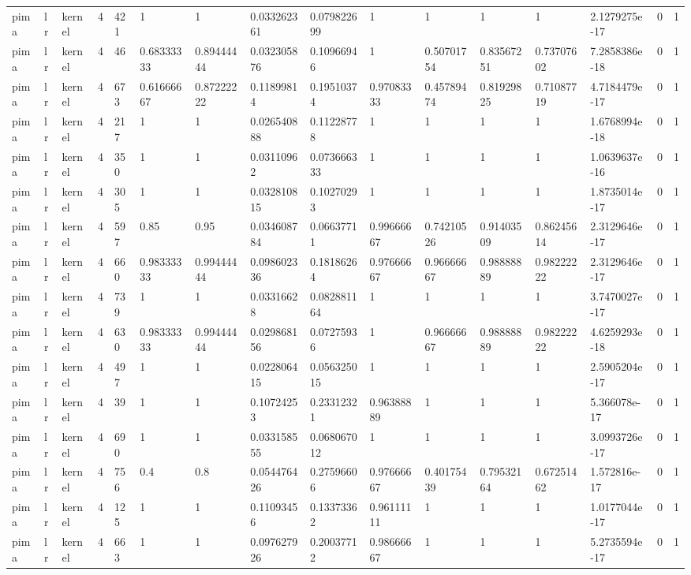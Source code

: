 \begin{tabular}{llllllllllllllll}
pima & lr & kernel & 4 & 421 & 1 & 1 & 0.033262361 & 0.079822699 & 1 & 1 & 1 & 1 & 2.1279275e-17 & 0 & 1 \\
pima & lr & kernel & 4 & 46 & 0.68333333 & 0.89444444 & 0.032305876 & 0.10966946 & 1 & 0.50701754 & 0.83567251 & 0.73707602 & 7.2858386e-18 & 0 & 1 \\
pima & lr & kernel & 4 & 673 & 0.61666667 & 0.87222222 & 0.11899814 & 0.19510374 & 0.97083333 & 0.45789474 & 0.81929825 & 0.71087719 & 4.7184479e-17 & 0 & 1 \\
pima & lr & kernel & 4 & 217 & 1 & 1 & 0.026540888 & 0.11228778 & 1 & 1 & 1 & 1 & 1.6768994e-18 & 0 & 1 \\
pima & lr & kernel & 4 & 350 & 1 & 1 & 0.03110962 & 0.073666333 & 1 & 1 & 1 & 1 & 1.0639637e-16 & 0 & 1 \\
pima & lr & kernel & 4 & 305 & 1 & 1 & 0.032810815 & 0.10270293 & 1 & 1 & 1 & 1 & 1.8735014e-17 & 0 & 1 \\
pima & lr & kernel & 4 & 597 & 0.85 & 0.95 & 0.034608784 & 0.06637711 & 0.99666667 & 0.74210526 & 0.91403509 & 0.86245614 & 2.3129646e-17 & 0 & 1 \\
pima & lr & kernel & 4 & 660 & 0.98333333 & 0.99444444 & 0.098602336 & 0.18186264 & 0.97666667 & 0.96666667 & 0.98888889 & 0.98222222 & 2.3129646e-17 & 0 & 1 \\
pima & lr & kernel & 4 & 739 & 1 & 1 & 0.03316628 & 0.082881164 & 1 & 1 & 1 & 1 & 3.7470027e-17 & 0 & 1 \\
pima & lr & kernel & 4 & 630 & 0.98333333 & 0.99444444 & 0.029868156 & 0.07275936 & 1 & 0.96666667 & 0.98888889 & 0.98222222 & 4.6259293e-18 & 0 & 1 \\
pima & lr & kernel & 4 & 497 & 1 & 1 & 0.022806415 & 0.056325015 & 1 & 1 & 1 & 1 & 2.5905204e-17 & 0 & 1 \\
pima & lr & kernel & 4 & 39 & 1 & 1 & 0.10724253 & 0.23312321 & 0.96388889 & 1 & 1 & 1 & 5.366078e-17 & 0 & 1 \\
pima & lr & kernel & 4 & 690 & 1 & 1 & 0.033158555 & 0.068067012 & 1 & 1 & 1 & 1 & 3.0993726e-17 & 0 & 1 \\
pima & lr & kernel & 4 & 756 & 0.4 & 0.8 & 0.054476426 & 0.27596606 & 0.97666667 & 0.40175439 & 0.79532164 & 0.67251462 & 1.572816e-17 & 0 & 1 \\
pima & lr & kernel & 4 & 125 & 1 & 1 & 0.11093456 & 0.13373362 & 0.96111111 & 1 & 1 & 1 & 1.0177044e-17 & 0 & 1 \\
pima & lr & kernel & 4 & 663 & 1 & 1 & 0.097627926 & 0.20037712 & 0.98666667 & 1 & 1 & 1 & 5.2735594e-17 & 0 & 1 \\

\end{tabular}
